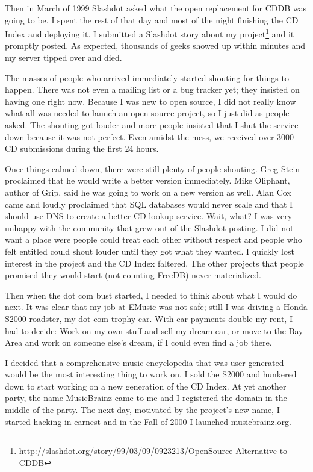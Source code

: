 Then in March of 1999 Slashdot asked what the open replacement for CDDB was
going to be. I spent the rest of that day and most of the night finishing the CD
Index and deploying it. I submitted a Slashdot story about my
project\footnote{\url{
http://slashdot.org/story/99/03/09/0923213/OpenSource-Alternative-to-CDDB}} and
it promptly posted. As expected, thousands of geeks showed up within minutes and
my server tipped over and died.

The masses of people who arrived immediately started shouting for things to
happen. There was not even a mailing list or a bug tracker yet; they insisted on
having one right now. Because I was new to open source, I did not really know
what all was needed to launch an open source project, so I just did as people
asked.  The shouting got louder and more people insisted that I shut the service
down because it was not perfect. Even amidst the mess, we received over 3000 CD
submissions during the first 24 hours.

Once things calmed down, there were still plenty of people shouting. Greg Stein
proclaimed that he would write a better version immediately. Mike Oliphant,
author of Grip, said he was going to work on a new version as well. Alan Cox
came and loudly proclaimed that SQL databases would never scale and that I
should use DNS to create a better CD lookup service. Wait, what?
I was very unhappy with the community that grew out of the Slashdot posting. I
did not want a place were people could treat each other without respect and
people who felt entitled could shout louder until they got what they wanted. I
quickly lost interest in the project and the CD Index faltered. The other
projects that people promised they would start (not counting FreeDB) never
materialized.

Then when the dot com bust started, I needed to think about what I would do
next. It was clear that my job at EMusic was not safe; still I was driving a
Honda S2000 roadster, my dot com trophy car. With car payments double my rent, I
had to decide: Work on my own stuff and sell my dream car, or move to the Bay
Area and work on someone else’s dream, if I could even find a job there.

I decided that a comprehensive music encyclopedia that was user generated would
be the most interesting thing to work on. I sold the S2000 and hunkered down to
start working on a new generation of the CD Index. At yet another party, the
name MusicBrainz came to me and I registered the domain in the middle of the
party. The next day, motivated by the project’s new name, I started hacking in
earnest and in the Fall of 2000 I launched musicbrainz.org.

